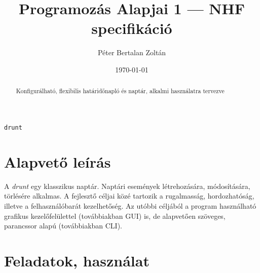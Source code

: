 \documentclass[a4paper]{article}
\title{Programozás Alapjai 1 --- NHF specifikáció}
\author{Péter Bertalan Zoltán}
\date{\today}
\begin{document}
	\begin{titlepage}
		\maketitle
		\vspace{4cm}
		\begin{center}
			\Huge
			\texttt{drunt}
		\end{center}
		\vspace{1cm}
		\begin{abstract}
			Konfigurálható, flexibilis határidőnapló és naptár, alkalmi használatra tervezve
		\end{abstract}
	\end{titlepage}

	\section{Alapvető leírás}
	
	A \textit{drunt} egy klasszikus naptár. Naptári események létrehozására, módosítására, törlésére alkalmas. A fejlesztő céljai közé tartozik a rugalmasság, hordozhatóság, illetve a felhasználóbarát kezelhetőség. Az utóbbi céljából a program használható grafikus kezelőfelülettel (továbbiakban GUI) is, de alapvetően szöveges, parancssor alapú (továbbiakban CLI).
	
	\section{Feladatok, használat}
	
\end{document}
